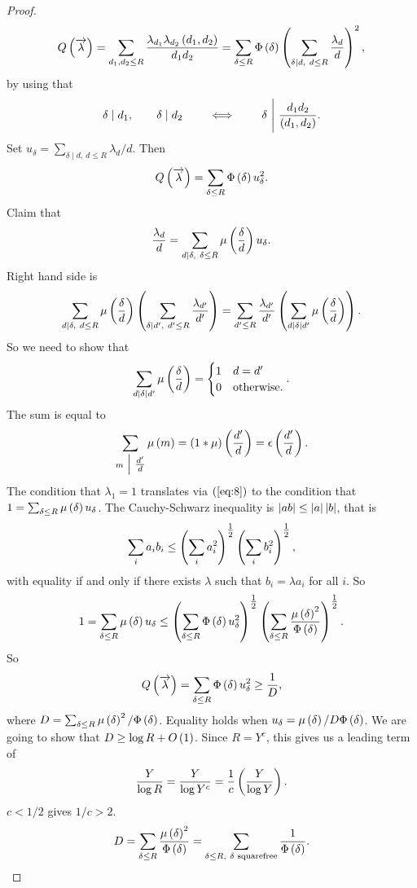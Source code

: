 \begin{proof}
$$ Q\left( \overrightarrow{\lambda} \right) = \sum_{d_1, d_2 \le R} \dfrac{\lambda_{d_1}\lambda_{d_2}\left( d_1, d_2 \right)}{d_1d_2} = \sum_{\delta \le R} \Phi\left( \delta \right)\left( \sum_{\delta \mid d, \ d \le R} \dfrac{\lambda_d}{d} \right)^2, $$
by using that
$$ \delta \mid d_1, \qquad \delta \mid d_2 \qquad \iff \qquad \delta \ \Bigg| \ \dfrac{d_1d_2}{\left( d_1, d_2 \right)}. $$
Set $ u_\delta = \sum_{\delta \mid d, \ d \le R} \lambda_d / d $.
Then
$$ Q\left( \overrightarrow{\lambda} \right) = \sum_{\delta \le R} \Phi\left( \delta \right)u_\delta^2. $$
Claim that
\begin{equation}
\label{eq:8}
\dfrac{\lambda_d}{d} = \sum_{d \mid \delta, \ \delta \le R} \mu\left( \dfrac{\delta}{d} \right)u_\delta.
\end{equation}
Right hand side is
$$ \sum_{d \mid \delta, \ d \le R} \mu\left( \dfrac{\delta}{d} \right)\left( \sum_{\delta \mid d', \ d' \le R} \dfrac{\lambda_{d'}}{d'} \right) = \sum_{d' \le R} \dfrac{\lambda_{d'}}{d'}\left( \sum_{d \mid \delta \mid d'} \mu\left( \dfrac{\delta}{d} \right) \right). $$
So we need to show that
$$ \sum_{d \mid \delta \mid d'} \mu\left( \dfrac{\delta}{d} \right) = \begin{cases}
1 & d = d' \\
0 & \text{otherwise}.
\end{cases}. $$
The sum is equal to
$$ \sum_{m \ \Big| \  \tfrac{d'}{d}} \mu\left( m \right) = \left( 1 * \mu \right)\left( \dfrac{d'}{d} \right) = \epsilon\left( \dfrac{d'}{d} \right). $$
The condition that $ \lambda_1 = 1 $ translates via $ \left( \ref{eq:8} \right) $ to the condition that $ 1 = \sum_{\delta \le R} \mu\left( \delta \right)u_\delta $. The Cauchy-Schwarz inequality is $ \left\lvert ab \right\rvert \le \left\lvert a \right\rvert\left\lvert b \right\rvert $, that is
$$ \sum_i a_ib_i \le \left( \sum_i a_i^2 \right)^{\tfrac{1}{2}}\left( \sum_i b_i^2 \right)^{\tfrac{1}{2}}, $$
with equality if and only if there exists $ \lambda $ such that $ b_i = \lambda a_i $ for all $ i $. So
$$ 1 = \sum_{\delta \le R} \mu\left( \delta \right)u_\delta \le \left( \sum_{\delta \le R}\Phi\left( \delta \right)u_\delta^2 \right)^{\tfrac{1}{2}}\left( \sum_{\delta \le R}\dfrac{\mu\left( \delta \right)^2}{\Phi\left( \delta \right)} \right)^{\tfrac{1}{2}}. $$
So
$$ Q\left( \overrightarrow{\lambda} \right) = \sum_{\delta \le R} \Phi\left( \delta \right)u_\delta^2 \ge \dfrac{1}{D}, $$
where $ D = \sum_{\delta \le R} \mu\left( \delta \right)^2 / \Phi\left( \delta \right) $. Equality holds when $ u_\delta = \mu\left( \delta \right) / D\Phi\left( \delta \right) $. We are going to show that $ D \ge \log R + O\left( 1 \right) $. Since $ R = Y^c $, this gives us a leading term of
$$ \dfrac{Y}{\log R} = \dfrac{Y}{\log Y^c} = \dfrac{1}{c}\left( \dfrac{Y}{\log Y} \right). $$
$ c < 1 / 2 $ gives $ 1 / c > 2 $.
$$ D = \sum_{\delta \le R} \dfrac{\mu\left( \delta \right)^2}{\Phi\left( \delta \right)} = \sum_{\delta \le R, \ \delta \text{ squarefree}} \dfrac{1}{\Phi\left( \delta \right)}. $$

\end{proof}
